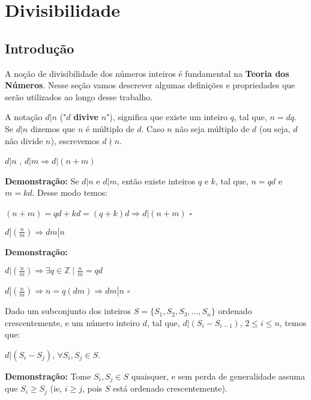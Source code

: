 
\chapter{Divisibilidade} %

\label{Chapter1} %


\section{Introdução}
A noção de divisibilidade dos números inteiros é fundamental na \textbf{Teoria dos Números}.
Nesse seção vamos descrever algumas definições e propriedades que serão utilizados ao longo desse trabalho.

\begin{definition}
A notação $d|n$ ("$d$ \textbf{divive} $n$"), significa que existe um inteiro $q$, tal que, $n = dq$.
Se $d|n$ dizemos que $n$ é múltiplo de $d$. Caso $n$ não seja múltiplo de $d$ (ou seja, $d$ não divide $n$), escrevemos $d \nmid n$.
\end{definition}


\begin{corollary}\label{divisibilidade_transitiva}
$d|n$ , $d|m \Rightarrow d|(n+m)$
\end{corollary}
\textbf{Demonstração:}
Se $d|n$ e $d|m$, então existe inteiros $q$ e $k$, tal que, $n = qd$ e $m = kd$. Desse modo temos:

$(n+m) = qd + kd = (q + k)d \Rightarrow d|(n+m) $ $\square$


\begin{corollary}\label{divisibilidade_fracao}
$d|(\frac{n}{m}) \Rightarrow dm|n$
\end{corollary}
\textbf{Demonstração:}

$d|(\frac{n}{m}) \Rightarrow \exists q \in \mathbb{Z} \mid \frac{n}{m} = qd$

$d|(\frac{n}{m}) \Rightarrow n = q(dm) \Rightarrow dm|n$ $\square$


\begin{corollary}\label{corolario_divisibilidade_1}
Dado um subconjunto dos inteiros $S = \{S_1, S_2, S_3, ..., S_n\}$ ordenado crescentemente, e um número inteiro $d$, tal que, $d|(S_i-S_{i-1})$, $2 \leq i \leq n$, 
temos que: 

$d|(S_i-S_j)$, $\forall S_i, S_j \in S$.

\end{corollary}
\textbf{Demonstração:}
Tome $S_i,S_j \in S$ quaisquer, e sem perda de generalidade assuma que $S_i \geq S_j$ (ie, $i \geq j$, pois $S$ está ordenado crescentemente).

